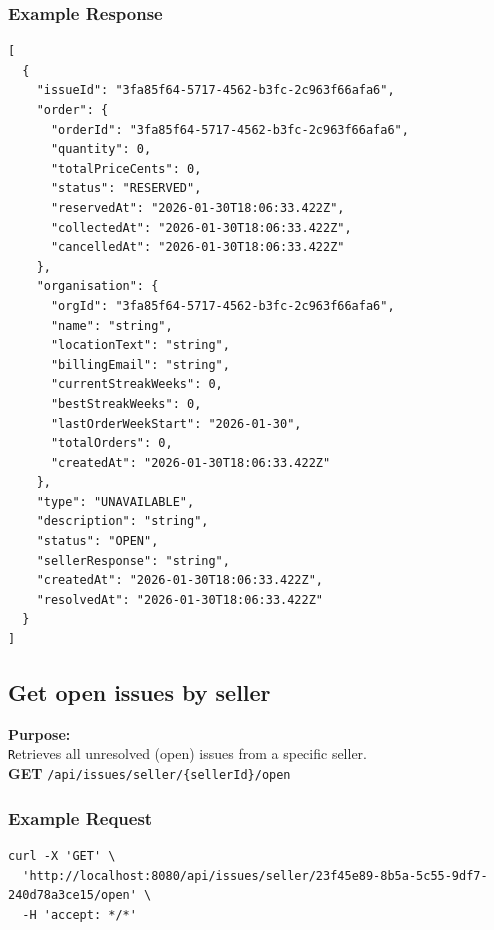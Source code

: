\documentclass[a4paper,11pt]{article}
\begin{document}
\subsubsection*{Example Response}
\begin{lstlisting}
[
  {
    "issueId": "3fa85f64-5717-4562-b3fc-2c963f66afa6",
    "order": {
      "orderId": "3fa85f64-5717-4562-b3fc-2c963f66afa6",
      "quantity": 0,
      "totalPriceCents": 0,
      "status": "RESERVED",
      "reservedAt": "2026-01-30T18:06:33.422Z",
      "collectedAt": "2026-01-30T18:06:33.422Z",
      "cancelledAt": "2026-01-30T18:06:33.422Z"
    },
    "organisation": {
      "orgId": "3fa85f64-5717-4562-b3fc-2c963f66afa6",
      "name": "string",
      "locationText": "string",
      "billingEmail": "string",
      "currentStreakWeeks": 0,
      "bestStreakWeeks": 0,
      "lastOrderWeekStart": "2026-01-30",
      "totalOrders": 0,
      "createdAt": "2026-01-30T18:06:33.422Z"
    },
    "type": "UNAVAILABLE",
    "description": "string",
    "status": "OPEN",
    "sellerResponse": "string",
    "createdAt": "2026-01-30T18:06:33.422Z",
    "resolvedAt": "2026-01-30T18:06:33.422Z"
  }
]
\end{lstlisting}

\subsection{Get open issues by seller}
\textbf{Purpose:} \\ \texttt Retrieves all unresolved (open) issues from a specific seller. \\

\textbf{GET} \texttt{/api/issues/seller/\{sellerId\}/open}

\subsubsection*{Example Request}
\begin{lstlisting}
curl -X 'GET' \
  'http://localhost:8080/api/issues/seller/23f45e89-8b5a-5c55-9df7-240d78a3ce15/open' \
  -H 'accept: */*'
\end{lstlisting}
\end{document}
